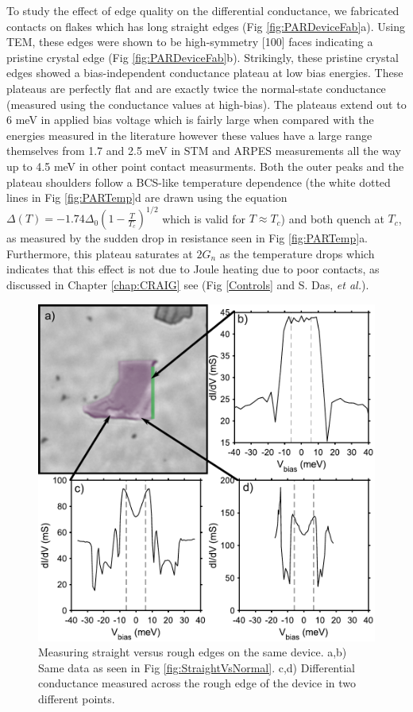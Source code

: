 To study the effect of edge quality on the differential conductance, we fabricated contacts on flakes which has long straight edges (Fig \ref{fig:PARDeviceFab}a). Using TEM, these edges were shown to be high-symmetry [100] faces indicating a pristine crystal edge (Fig \ref{fig:PARDeviceFab}b). Strikingly, these pristine crystal edges showed a bias-independent conductance plateau at low bias energies. These plateaus are perfectly flat and are exactly twice the normal-state conductance (measured using the conductance values at high-bias). The plateaus extend out to 6 meV in applied bias voltage which is fairly large when compared with the energies measured in the literature however these values have a large range themselves from 1.7 and 2.5 meV in STM and ARPES measurements\cite{Zhang2018, Zhu2020} all the way up to 4.5 meV in other point contact measurments\cite{Tang2019}. Both the outer peaks and the plateau shoulders follow a \ac{BCS}-like temperature dependence (the white dotted lines in Fig \ref{fig:PARTemp}d are drawn using the equation $\Delta(T) = -1.74\Delta_{0}(1-\frac{T}{T_{c}})^{1/2}$ which is valid for $T\approx T_{c}$) and both quench at $T_{c}$, as measured by the sudden drop in resistance seen in Fig \ref{fig:PARTemp}a. Furthermore, this plateau saturates at $2G_{n}$ as the temperature drops which indicates that this effect is not due to Joule heating due to poor contacts, as discussed in Chapter \ref{chap:CRAIG} see (Fig \ref{Controls} and S. Das, \textit{et al.}\cite{Das2019}).\par
\begin{figure}
	\centering
	\includegraphics[width=\textwidth]{Chap4/Figures/ControlFlake.pdf}
	\caption{Measuring straight versus rough edges on the same device. a,b) Same data as seen in Fig \ref{fig:StraightVsNormal}. c,d) Differential conductance measured across the rough edge of the device in two different points.}
	\label{fig:ControlDevice}
\end{figure}
